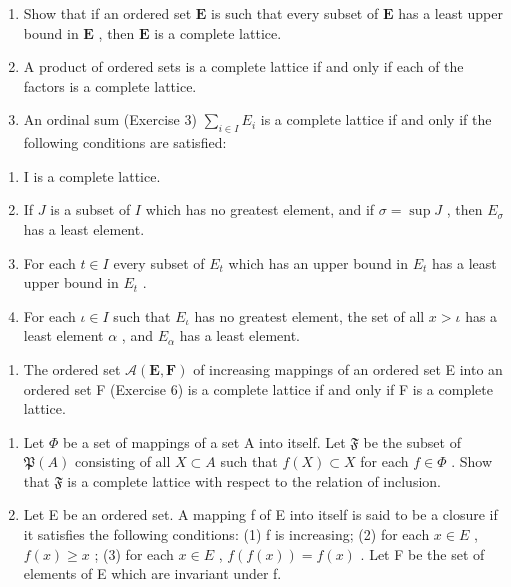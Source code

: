 \begin{enumerate}
\def\labelenumi{(\alph{enumi})}
\item
  Show that if an ordered set \(\mathbf{E}\) is such that every subset of \(\mathbf{E}\) has a least upper bound in \(\mathbf{E}\) , then \(\mathbf{E}\) is a complete lattice.
\item
  A product of ordered sets is a complete lattice if and only if each of the factors is a complete lattice.
\item
  An ordinal sum (Exercise 3) \(\sum_{i\in I}E_i\) is a complete lattice if and only if the following conditions are satisfied:
\end{enumerate}

\begin{enumerate}
\def\labelenumi{(\Roman{enumi})}
\item
  I is a complete lattice.
\item
  If \(J\) is a subset of \(I\) which has no greatest element, and if \(\sigma = \sup J\) , then \(E_{\sigma}\) has a least element.
\item
  For each \(t \in I\) every subset of \(E_t\) which has an upper bound in \(E_t\) has a least upper bound in \(E_t\) .
\item
  For each \(\iota\in I\) such that \(E_{\iota}\) has no greatest element, the set of all \(x>\iota\) has a least element \(\alpha\) , and \(E_{\alpha}\) has a least element.
\end{enumerate}

\begin{enumerate}
\def\labelenumi{(\alph{enumi})}
\setcounter{enumi}{3}
\tightlist
\item
  The ordered set \(\mathcal{A}(\mathbf{E},\mathbf{F})\) of increasing mappings of an ordered set E into an ordered set F (Exercise 6) is a complete lattice if and only if F is a complete lattice.
\end{enumerate}

\begin{enumerate}
\def\labelenumi{\arabic{enumi}.}
\setcounter{enumi}{11}
\item
  Let \(\Phi\) be a set of mappings of a set A into itself. Let \(\mathfrak{F}\) be the subset of \(\mathfrak{P}(A)\) consisting of all \(X \subset A\) such that \(f(X) \subset X\) for each \(f \in \Phi\) . Show that \(\mathfrak{F}\) is a complete lattice with respect to the relation of inclusion.
\item
  Let E be an ordered set. A mapping f of E into itself is said to be a closure if it satisfies the following conditions: (1) f is increasing; (2) for each \(x \in E\) , \(f(x) \geqslant x\) ; (3) for each \(x \in E\) , \(f(f(x)) = f(x)\) . Let F be the set of elements of E which are invariant under f.
\end{enumerate}

